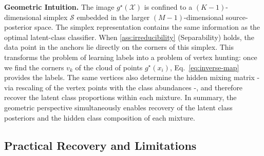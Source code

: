 \documentclass{article}
\theoremstyle{plain}
\theoremstyle{definition}
\theoremstyle{remark}
\newcommand{\X}{\mathcal{X}}
\newcommand{\asmp}[1]{\ref{#1}} %
\begin{document}
\textbf{Geometric Intuition.}
The image $g^\star(\X)$ is confined to a $(K-1)$-dimensional simplex $\mathcal{S}$ embedded in the larger $(M-1)$-dimensional source-posterior space. The simplex representation contains the same information as the optimal latent-class classifier. When \asmp{ass:irreducibility} (Separability) holds, the data point in the anchors lie directly on the corners of this simplex. This transforms the problem of learning labels into a problem of vertex hunting: once we find the corners $v_k$ of the cloud of points $g^\star(x_i)$, Eq.~\ref{eq:inverse-map} provides the labels. The same vertices also determine the hidden mixing matrix - via rescaling of the vertex points with the class abundances -, and therefore recover the latent class proportions within each mixture. \newline
In summary, the geometric perspective simultaneously enables recovery of the latent class posteriors and the hidden class composition of each mixture.

\subsection{Practical Recovery and Limitations}
\label{sec:recovery-limitations}
\end{document}
